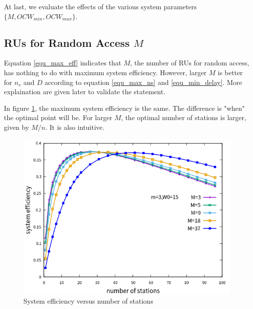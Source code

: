\documentclass[journal]{IEEEtran}
\begin{document}
At last, we evaluate the effects of the various system parameters $\lbrace M, OCW_{min}, OCW_{max}\rbrace$.

\subsection{RUs for Random Access $M$}
\label{M}
Equation \ref{equ_max_eff} indicates that $M$, the number of RUs for random access, has nothing to do with maximum system efficiency. 
However, larger $M$ is better for $n_s$ and $D$ according to equation \ref{equ_max_ns} and \ref{equ_min_delay}. More explaination are given later to validate the statement. 

In figure \ref{fig_n_M_eff}, the maximum system efficiency is the same. 
The difference is "when" the optimal point will be. 
For larger $M$, the optimal number of stations is larger, given by $M/n$. It is also intuitive.

\begin{figure}[!h]
\centering
\includegraphics[scale=.54]{./figure/n_M_eff_perf.png}
\caption{System efficiency versus number of stations}
\label{fig_n_M_eff}
\end{figure}
\end{document}
